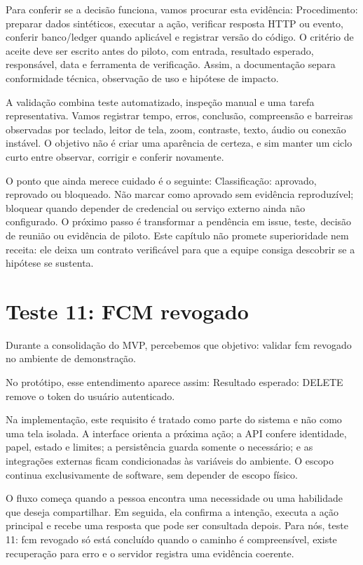 \documentclass[12pt,oneside,a4paper,article]{abntex2}
\begin{document}
Para conferir se a decisão funciona, vamos procurar esta evidência: Procedimento: preparar dados sintéticos, executar a ação, verificar resposta HTTP ou evento, conferir banco/ledger quando aplicável e registrar versão do código. O critério de aceite deve ser escrito antes do piloto, com entrada, resultado esperado, responsável, data e ferramenta de verificação. Assim, a documentação separa conformidade técnica, observação de uso e hipótese de impacto.

A validação combina teste automatizado, inspeção manual e uma tarefa representativa. Vamos registrar tempo, erros, conclusão, compreensão e barreiras observadas por teclado, leitor de tela, zoom, contraste, texto, áudio ou conexão instável. O objetivo não é criar uma aparência de certeza, e sim manter um ciclo curto entre observar, corrigir e conferir novamente.

O ponto que ainda merece cuidado é o seguinte: Classificação: aprovado, reprovado ou bloqueado. Não marcar como aprovado sem evidência reproduzível; bloquear quando depender de credencial ou serviço externo ainda não configurado. O próximo passo é transformar a pendência em issue, teste, decisão de reunião ou evidência de piloto. Este capítulo não promete superioridade nem receita: ele deixa um contrato verificável para que a equipe consiga descobrir se a hipótese se sustenta.

\section{Teste 11: FCM revogado}
Durante a consolidação do MVP, percebemos que objetivo: validar fcm revogado no ambiente de demonstração.

No protótipo, esse entendimento aparece assim: Resultado esperado: DELETE remove o token do usuário autenticado.

Na implementação, este requisito é tratado como parte do sistema e não como uma tela isolada. A interface orienta a próxima ação; a API confere identidade, papel, estado e limites; a persistência guarda somente o necessário; e as integrações externas ficam condicionadas às variáveis do ambiente. O escopo continua exclusivamente de software, sem depender de escopo físico.

O fluxo começa quando a pessoa encontra uma necessidade ou uma habilidade que deseja compartilhar. Em seguida, ela confirma a intenção, executa a ação principal e recebe uma resposta que pode ser consultada depois. Para nós, teste 11: fcm revogado só está concluído quando o caminho é compreensível, existe recuperação para erro e o servidor registra uma evidência coerente.
\end{document}
